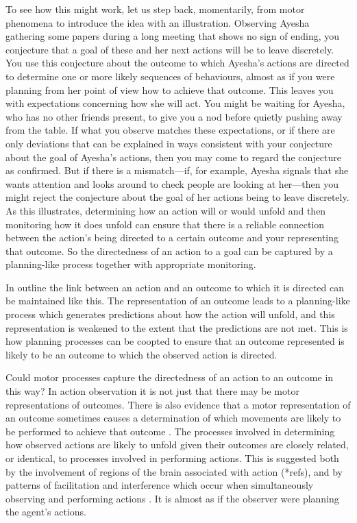\documentclass[12pt,\papersize]{extarticle}
\begin{document}
To see how this might work, let us step back, momentarily, from motor phenomena to introduce the idea with an illustration.  Observing Ayesha gathering some papers during a long meeting that shows no sign of ending, you conjecture that a goal of these and her next actions will be to leave discretely. You use this conjecture about the outcome to which Ayesha's actions are directed to determine one or more likely sequences of behaviours, almost as if you were planning from her point of view how to achieve that outcome. This leaves you with expectations concerning how she will act. You might be waiting for Ayesha, who has no other friends present, to give you a nod before quietly pushing away from the table. If what you observe matches these expectations, or if there are only deviations that can be explained in ways consistent with your conjecture about the goal of Ayesha's actions, then you may come to regard the conjecture as confirmed. But if there is a mismatch---if, for example, Ayesha signals that she wants attention and looks around to check people are looking at her---then you might reject the conjecture about the goal of her actions being to leave discretely. As this illustrates, determining how an action will or would unfold and then monitoring how it does unfold can ensure that there is a reliable connection between the action's being directed to a certain outcome and your representing that outcome. So the directedness of an action to a goal can be captured by a planning-like process together with appropriate monitoring.

In outline the link between an action and an outcome to which it is directed can be maintained like this. The representation of an outcome leads to a planning-like process which generates predictions about how the action will unfold, and this representation is weakened to the extent that the predictions are not met.  This is how planning processes can be coopted to ensure that an outcome represented is likely to be an outcome to which the observed action is directed.

Could motor processes capture the directedness of an action to an outcome in this way? In action observation it is not just that there may be motor representations of outcomes. There is also evidence that a motor representation of an outcome sometimes causes a determination of which movements are likely to be performed to achieve that outcome  \citep{kilner:2004_motor, urgesi:2010_simulating}. The processes involved in determining how observed actions are likely to unfold given their outcomes are closely related, or identical, to processes involved in performing actions. This is suggested both by the involvement of regions of the brain associated with action (*refs), and by patterns of facilitation and interference which occur when simultaneously observing and performing actions \citep{brass:2000_compatibility, kilner:2003_interference, craighero:2002_hand}. It is almost as if the observer were planning the agent's actions. 
\end{document}
